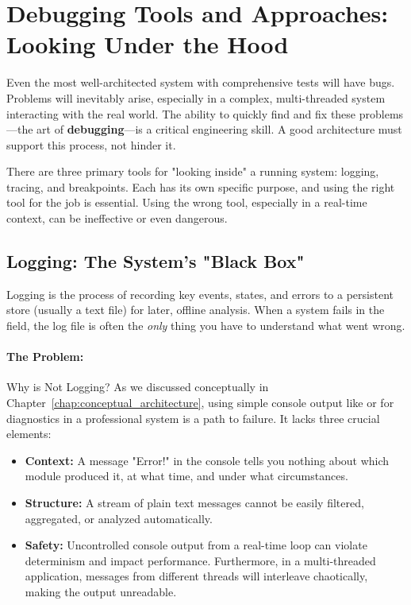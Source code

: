 






\section{Debugging Tools and Approaches: Looking Under the Hood}
\label{sec:debugging_tools}

Even the most well-architected system with comprehensive tests will have bugs. Problems will inevitably arise, especially in a complex, multi-threaded system interacting with the real world. The ability to quickly find and fix these problems—the art of \textbf{debugging}—is a critical engineering skill. A good architecture must support this process, not hinder it.

There are three primary tools for "looking inside" a running system: logging, tracing, and breakpoints. Each has its own specific purpose, and using the right tool for the job is essential. Using the wrong tool, especially in a real-time context, can be ineffective or even dangerous.

\subsection{Logging: The System's "Black Box"}
\label{subsec:logging}

Logging is the process of recording key events, states, and errors to a persistent store (usually a text file) for later, offline analysis. When a system fails in the field, the log file is often the \textit{only} thing you have to understand what went wrong.

\paragraph{The Problem:} Why  is Not Logging?
As we discussed conceptually in Chapter~\ref{chap:conceptual_architecture}, using simple console output like  or  for diagnostics in a professional system is a path to failure. It lacks three crucial elements:
\begin{itemize}
    \item \textbf{Context:} A message "Error!" in the console tells you nothing about which module produced it, at what time, and under what circumstances.
    \item \textbf{Structure:} A stream of plain text messages cannot be easily filtered, aggregated, or analyzed automatically.
    \item \textbf{Safety:} Uncontrolled console output from a real-time loop can violate determinism and impact performance. Furthermore, in a multi-threaded application, messages from different threads will interleave chaotically, making the output unreadable.
\end{itemize}


